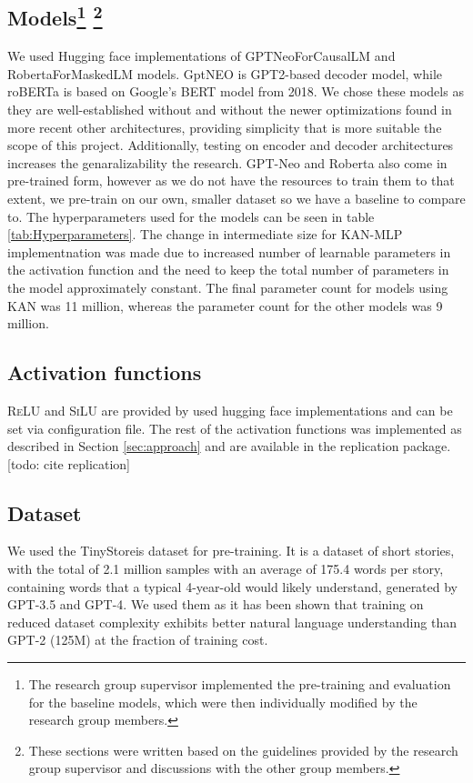 \subsection{Models\protect\footnote{\label{footnote:code} The research group supervisor implemented the pre-training and evaluation for the baseline models, which were then individually modified by the research group members.} \protect\footnote{\label{footnote:text} These sections were written based on the guidelines provided by the research group supervisor and discussions with the other group members.}}
We used Hugging face implementations of GPTNeoForCausalLM \cite{huggingfaceNEO} and RobertaForMaskedLM \cite{huggingfaceRoberta} models. GptNEO is GPT2-based decoder model, while roBERTa is based on Google's BERT model from 2018. We chose these models as they are well-established without and without the newer optimizations found in more recent other architectures, providing simplicity that is more suitable the scope of this project. Additionally, testing on encoder and decoder architectures increases the genaralizability the research. GPT-Neo and Roberta also come in pre-trained form, however as we do not have the resources to train them to that extent, we pre-train on our own, smaller dataset so we have a baseline to compare to. The hyperparameters used for the models can be seen in table \ref{tab:Hyperparameters}. The change in intermediate size for KAN-MLP implementnation was made due to increased number of learnable parameters in the activation function and the need to keep the total number of parameters in the model approximately constant. The final parameter count for models using KAN was 11 million, whereas the parameter count for the other models was 9 million.

\subsection{Activation functions}
\textsc{ReLU} and \textsc{SiLU} are provided by used hugging face implementations and can be set via configuration file. The rest of the activation functions was implemented as described in Section \ref{sec:approach} and are available in the replication package. [todo: cite replication]

\subsection{Dataset\protect\footnotemark[5]}
We used the TinyStoreis \cite{Eldan2023} dataset for pre-training. It is a dataset of short stories, with the total of 2.1 million samples with an average of 175.4 words per story, containing words that a typical 4-year-old would likely understand, generated by GPT-3.5 and GPT-4. We used them as it has been shown that training on reduced dataset complexity exhibits better natural language understanding than GPT-2 (125M) at the fraction of training cost.

